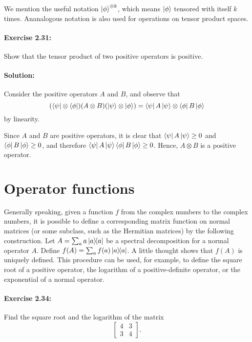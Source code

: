 We mention the useful notation $\ket{\phi}^{\otimes k}$, which means
$\ket{\phi}$ tensored with itself $k$ times. Ananalogous notation is also used
for operations on tensor product spaces.

\paragraph{\cite{mikeandike} Exercise 2.31:} Show that the tensor product of
two positive operators is positive.

\paragraph{Solution:} Consider the positive operators $A$ and $B$, and observe
that \begin{equation*}
  (\bra{\psi} \otimes \bra{\phi})(A \otimes B)(\ket{\psi} \otimes \ket{\phi})
    = \bra{\psi}A\ket{\psi} \otimes \bra{\phi}B\ket{\phi}
\end{equation*} by linearity.

Since $A$ and $B$ are positive operators, it is clear that $\bra{\psi}A
\ket{\psi} \geq 0$ and $\bra{\phi}B\ket{\phi} \geq 0$, and therefore
$\bra{\psi}A\ket{\psi} \bra{\phi}B\ket{\phi} \geq 0$. Hence, $A \otimes B$ is a
positive operator.

\section{Operator functions}

Generally speaking, given a function $f$ from the complex numbers to the
complex numbers, it is possible to define a corresponding matrix function on
normal matrices (or some subclass, such as the Hermitian matrices) by the
following construction. Let $A = \sum_a a\ketbra{a}{a}$ be a spectral
decomposition for a normal operator $A$. Define $f(A) = \sum_a f(a)
\ketbra{a}{a}$. A little thought shows that $f(A)$ is uniquely defined. This
procedure can be used, for example, to define the square root of a positive
operator, the logarithm of a positive-definite operator, or the exponential
of a normal operator.

\paragraph{\cite{mikeandike} Exercise 2.34:} Find the square root and the
logarithm of the matrix \begin{equation*}
  \begin{bmatrix}
    4 & 3 \\
    3 & 4
  \end{bmatrix}.
\end{equation*}

